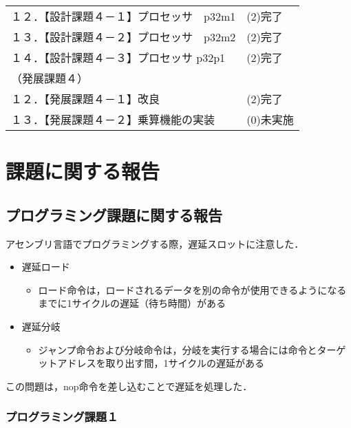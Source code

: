 \documentclass{jarticle}[11pt]
\begin{document}
\begin{table*}[h]
\begin{center}
\begin{tabular}{l|l}
  １２．【設計課題４－１】プロセッサ　p32m1&
  (2)完了
  \\ 

  １３．【設計課題４－２】プロセッサ　p32m2&
  (2)完了
  \\ 

  １４．【設計課題４－３】プロセッサ p32p1&
  (2)完了
  \\ 

  （発展課題４）&
  \\

  １２．【発展課題４－１】改良&
  (2)完了
  \\ 

  １３．【発展課題４－２】乗算機能の実装&
  (0)未実施
  \\ \hline

  \end{tabular}
  \end{center}
  \end{table*}

  \section{課題に関する報告}\label{sec:プログラミング課題に関する報告}

  \subsection{プログラミング課題に関する報告}
  アセンブリ言語でプログラミングする際，遅延スロットに注意した．
  \begin{itemize}
    \item 遅延ロード
    \begin{itemize}
      \item ロード命令は，ロードされるデータを別の命令が使用できるようになるまでに1サイクルの遅延（待ち時間）がある
    \end{itemize}
    \item 遅延分岐
    \begin{itemize}
      \item ジャンプ命令および分岐命令は，分岐を実行する場合には命令とターゲットアドレスを取り出す間，1サイクルの遅延がある
    \end{itemize}
  \end{itemize}

  この問題は，nop命令を差し込むことで遅延を処理した．

  \subsubsection{プログラミング課題１}
 
\end{document}
